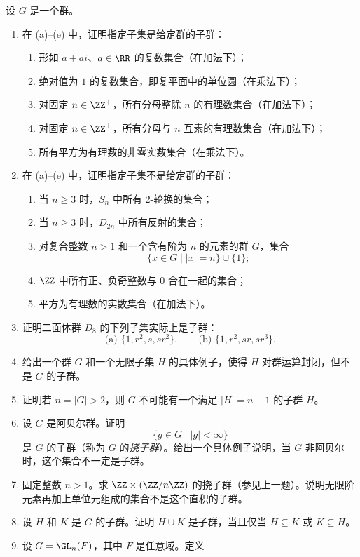 设 $G$ 是一个群。
\begin{enumerate}[label=\arabic*.]
  \item 在 (a)--(e) 中，证明指定子集是给定群的子群：
  \begin{enumerate}[label=(\alph*)]
    \item 形如 $a+ai$、$a\in\RR$ 的复数集合（在加法下）；
    \item 绝对值为 $1$ 的复数集合，即复平面中的单位圆（在乘法下）；
    \item 对固定 $n\in\ZZ^+$，所有分母整除 $n$ 的有理数集合（在加法下）；
    \item 对固定 $n\in\ZZ^+$，所有分母与 $n$ 互素的有理数集合（在加法下）；
    \item 所有平方为有理数的非零实数集合（在乘法下）。
  \end{enumerate}
  \item 在 (a)--(e) 中，证明指定子集不是给定群的子群：
  \begin{enumerate}[label=(\alph*)]
    \item 当 $n\geq 3$ 时，$S_n$ 中所有 $2$-轮换的集合；
    \item 当 $n\geq 3$ 时，$D_{2n}$ 中所有反射的集合；
    \item 对复合整数 $n>1$ 和一个含有阶为 $n$ 的元素的群 $G$，集合
    \[
      \{x\in G\mid |x|=n\}\cup\{1\};
    \]
    \item $\ZZ$ 中所有正、负奇整数与 $0$ 合在一起的集合；
    \item 平方为有理数的实数集合（在加法下）。
  \end{enumerate}
  \item 证明二面体群 $D_8$ 的下列子集实际上是子群：
  \[
    \text{(a) }\{1,r^2,s,sr^2\},\qquad
    \text{(b) }\{1,r^2,sr,sr^3\}.
  \]
  \item 给出一个群 $G$ 和一个无限子集 $H$ 的具体例子，使得 $H$ 对群运算封闭，但不是 $G$ 的子群。
  \item 证明若 $n=|G|>2$，则 $G$ 不可能有一个满足 $|H|=n-1$ 的子群 $H$。
  \item 设 $G$ 是阿贝尔群。证明
  \[
    \{g\in G\mid |g|<\infty\}
  \]
  是 $G$ 的子群（称为 $G$ 的\emph{挠子群}）。给出一个具体例子说明，当 $G$ 非阿贝尔时，这个集合不一定是子群。
  \item 固定整数 $n>1$。求 $\ZZ\times(\ZZ/n\ZZ)$ 的挠子群（参见上一题）。说明无限阶元素再加上单位元组成的集合不是这个直积的子群。
  \item 设 $H$ 和 $K$ 是 $G$ 的子群。证明 $H\cup K$ 是子群，当且仅当 $H\subseteq K$ 或 $K\subseteq H$。
  \item 设 $G=\GL_n(F)$，其中 $F$ 是任意域。定义

\end{enumerate}
